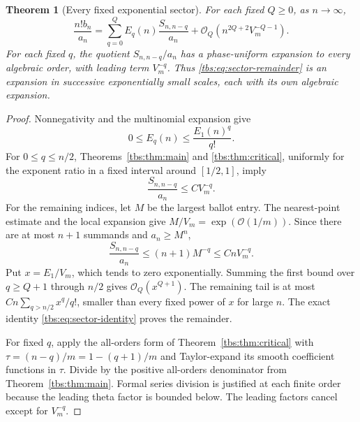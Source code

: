 \documentclass[11pt,a4paper]{article}
\numberwithin{equation}{section}
\newtheorem{theorem}{Theorem}[section]
\theoremstyle{definition}
\newcommand{\OO}{\mathcal O}
\begin{document}
\begin{theorem}[Every fixed exponential sector]\label{tbs:thm:sectors}
For each fixed $Q\ge0$, as $n\to\infty$,
\begin{equation}\label{tbs:eq:sector-remainder}
 \frac{n!b_n}{a_n}
 =\sum_{q=0}^{Q}E_q(n)\frac{S_{n,n-q}}{a_n}
 +\OO_Q\!\left(n^{2Q+2}V_m^{-Q-1}\right).
\end{equation}
For each fixed $q$, the quotient $S_{n,n-q}/a_n$ has a phase-uniform
expansion to every algebraic order, with leading term $V_m^{-q}$.
Thus \eqref{tbs:eq:sector-remainder} is an expansion in successive
exponentially small scales, each with its own algebraic expansion.
\end{theorem}
\begin{proof}
Nonnegativity and the multinomial expansion give
\[
 0\le E_q(n)\le\frac{E_1(n)^q}{q!}.
\]
For $0\le q\le n/2$, Theorems~\ref{tbs:thm:main} and \ref{tbs:thm:critical},
uniformly for the exponent ratio in a fixed interval around $[1/2,1]$,
imply
\[
 \frac{S_{n,n-q}}{a_n}\le C V_m^{-q}.
\]
For the remaining indices, let $M$ be the largest ballot entry. The
nearest-point estimate and the local expansion give
$M/V_m=\exp(\OO(1/m))$. Since there are at most $n+1$ summands and
$a_n\ge M^n$,
\[
 \frac{S_{n,n-q}}{a_n}\le(n+1)M^{-q}\le CnV_m^{-q}.
\]
Put $x=E_1/V_m$, which tends to zero exponentially. Summing the first
bound over $q\ge Q+1$ through $n/2$ gives $\OO_Q(x^{Q+1})$.
The remaining tail is at most
$Cn\sum_{q>n/2}x^q/q!$, smaller than every fixed power of $x$ for large
$n$. The exact identity \eqref{tbs:eq:sector-identity} proves the remainder.

For fixed $q$, apply the all-orders form of Theorem~\ref{tbs:thm:critical}
with $\tau=(n-q)/m=1-(q+1)/m$ and Taylor-expand its smooth coefficient
functions in $\tau$. Divide by the positive all-orders denominator from
Theorem~\ref{tbs:thm:main}. Formal series division is justified at each
finite order because the leading theta factor is bounded below.
The leading factors cancel except for $V_m^{-q}$.
\end{proof}
\end{document}
